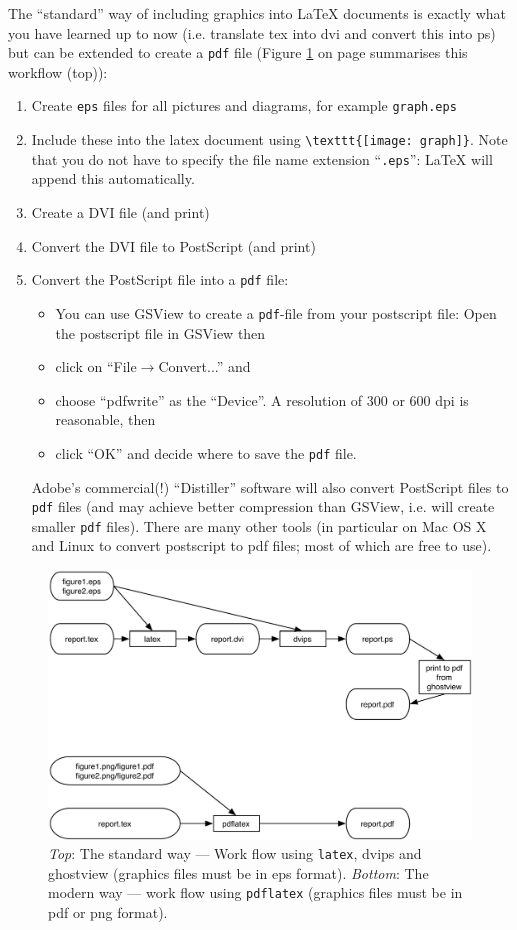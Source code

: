 \documentclass[12pt,a4paper]{article}
\begin{document}
The ``standard'' way of including graphics into LaTeX documents is
exactly what you have learned up to now (i.e. translate tex into dvi
and convert this into ps) but can be extended to create a \texttt{pdf}
file (Figure \ref{workflow} on page \pageref{workflow} summarises this
workflow (top)):
\begin{enumerate}
\item Create \texttt{eps} files for all pictures and diagrams, for
  example \texttt{graph.eps}
\item Include these into the latex document using
  \verb|\texttt{[image: graph]}|. Note that you do not have to specify
  the file name extension ``\texttt{.eps}'': LaTeX will append this
  automatically.
\item Create a DVI file (and print)
\item Convert the DVI file to PostScript (and print)
\item Convert the PostScript file into a \texttt{pdf} file:
  \begin{itemize}
  \item You can use GSView to create a \texttt{pdf}-file from your
    postscript file: Open the postscript file in GSView then
  \item click on ``File$\rightarrow$Convert...'' and
  \item choose ``pdfwrite'' as the ``Device''. A resolution of 300 or
    600 dpi is reasonable, then
  \item click ``OK'' and decide where to save the \texttt{pdf} file.
  \end{itemize}
  {\footnotesize Adobe's commercial(!) ``Distiller'' software will
    also convert PostScript files to \texttt{pdf} files (and may
    achieve better compression than GSView, i.e. will create smaller
    \texttt{pdf} files). There are many other tools (in particular on
    Mac OS X and Linux to convert postscript to pdf files; most of
    which are free to use).}
\end{enumerate}

\begin{figure}[t]
  \centering
  \includegraphics[width=1\textwidth]{flowdiagram}
  \caption{\emph{Top}: The standard way --- Work flow using
    \texttt{latex}, dvips and ghostview (graphics files must be in eps
    format). \emph{Bottom}: The modern way --- work flow using
    \texttt{pdflatex} (graphics files must be in pdf or png format).}
  \label{workflow}
\end{figure}
\end{document}
